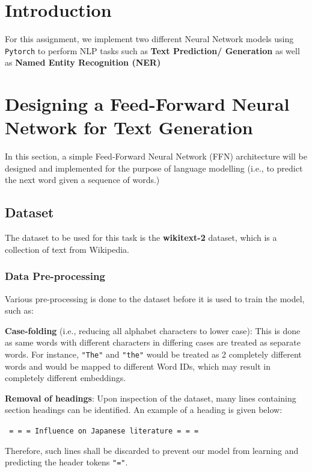 \documentclass[sigconf,nonacm=true]{acmart}
\begin{document}
\maketitle

\section{Introduction}
For this assignment, we implement two different Neural Network models using \verb|Pytorch| to perform NLP tasks such as \textbf{Text Prediction/ Generation} as well as \textbf{Named Entity Recognition (NER)}

\section{Designing a Feed-Forward Neural Network for Text Generation}
In this section, a simple Feed-Forward Neural Network (FFN) architecture
will be designed and implemented for the purpose of language modelling
(i.e., to predict the next word given a sequence of words.)

\subsection{Dataset}
The dataset to be used for this task is the \textbf{wikitext-2} dataset,
which is a collection of text from Wikipedia.
\subsubsection{Data Pre-processing}
Various pre-processing is done to the dataset before it is used to train the 
model, such as:

\textbf{Case-folding} (i.e., reducing all alphabet characters to lower case): 
This is done as same words with different characters in differing cases are
treated as separate words. For instance, \verb|"The"| and \verb|"the"| would
be treated as 2 completely different words and would be mapped to different 
Word IDs, which may result in completely different embeddings.

\textbf{Removal of headings}: Upon inspection of the dataset, many lines containing
section headings can be identified. An example of a heading is given below:

\verb| = = = Influence on Japanese literature = = = |

Therefore, such lines shall be discarded to prevent our model from learning 
and predicting the header tokens \verb|"="|.
\end{document}
